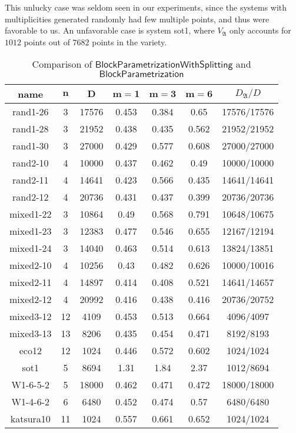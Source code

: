 \documentclass[final,1p,times,authoryear]{elsarticle}
\newcommand{\mainalgoname}{\mathsf{ BlockParametrization}}
\begin{document}
This unlucky case was seldom seen in our experiments, since the
systems with multiplicities generated randomly had few multiple
points, and thus were favorable to us. An unfavorable case is system
sot1, where $V_\mathfrak{A}$ only accounts for $1012$ points out of
$7682$ points in the variety. 


\begin{table}[H]
  \centering
  \def\arraystretch{1.2}
  \setlength\tabcolsep{6pt}
  \caption{Comparison of $\mathsf{BlockParametrizationWithSplitting}$ and $\mainalgoname$}
  \label{tbl:comparison_algos}
  \begin{tabular}{c|c|c|c|c|c|c}
    \textbf{name}& $\bm{n}$ & $\bm{D}$ & $\bm{m = 1}$ & $\bm{m = 3}$ & $\bm{m = 6}$&$D_\mathfrak{A}/D$\\
    \hline
    rand1-26&3 &17576&0.453&0.384&0.65&17576/17576 \\
    rand1-28&3 &21952&0.438&0.435&0.562& 21952/21952\\
    rand1-30&3 &27000&0.429&0.577&0.608&27000/27000 \\
    rand2-10&4 &10000&0.437&0.462&0.49& 10000/10000\\
    rand2-11&4 &14641&0.423&0.566&0.435&14641/14641 \\
    rand2-12&4 &20736&0.431&0.437&0.399&20736/20736 \\
    mixed1-22&3 &10864&0.49&0.568&0.791& 10648/10675\\
    mixed1-23&3 &12383&0.477&0.546&0.655& 12167/12194\\
    mixed1-24&3 &14040&0.463&0.514&0.613& 13824/13851\\
    mixed2-10&4 &10256&0.43&0.482&0.626& 10000/10016\\
    mixed2-11&4 &14897&0.414&0.408&0.521& 14641/14657\\
    mixed2-12&4 &20992&0.416&0.438&0.416&20736/20752 \\
    mixed3-12&12 &4109&0.453&0.513&0.664& 4096/4097\\
    mixed3-13&13 &8206&0.435&0.454&0.471& 8192/8193\\
    eco12&12 &1024&0.446&0.572&0.602& 1024/1024\\
    sot1&5 &8694&1.31&1.84&2.37& 1012/8694\\
    W1-6-5-2&5 &18000&0.462&0.471&0.472& 18000/18000\\
    W1-4-6-2&6 &6480&0.452&0.474&0.57& 6480/6480\\
    katsura10&11 &1024&0.557&0.661&0.652& 1024/1024
  \end{tabular}
\end{table}
\end{document}
